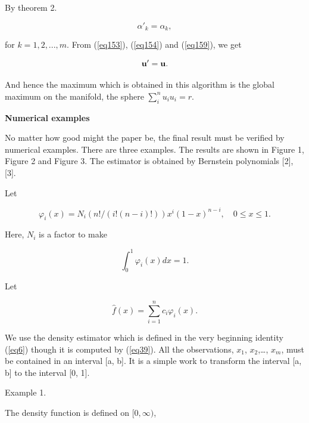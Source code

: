 \documentclass [18pt]{article}
\begin{document}
By theorem 2.


\begin{equation}
\label{eq159}
\alpha '_k = \alpha _k ,
\end{equation}



\noindent
for $k = 1,2,...,m$. From (\ref{eq153}), (\ref{eq154}) and (\ref{eq159}), we get


\begin{equation}
\label{eq160}
{\rm {\bf u}}' = {\rm {\bf u}}.
\end{equation}



And hence the maximum which is obtained in this algorithm is the global
maximum on the manifold, the sphere $\sum\limits_i^n {u_i } u_i = r$.

\textbf{Numerical examples}

No matter how good might the paper be, the final result must be verified by
numerical examples. There are three examples. The results are shown in
Figure 1, Figure 2 and Figure 3. The estimator is obtained by Bernstein
polynomials [2], [3].

Let


\begin{equation}
\label{eq161}
\varphi _i (x) = N_i (n! / (i!(n - i)!))x^i(1 - x)^{n - i},
\quad
0 \le x \le 1.
\end{equation}



Here, $N_i $ is a factor to make


\begin{equation}
\label{eq162}
\int_0^1 {\varphi _i (x)dx = 1} .
\end{equation}



Let


\begin{equation}
\label{eq163}
\widehat{f}(x) = \sum\limits_{i = 1}^n {c_i \varphi _i (x)} .
\end{equation}



We use the density estimator which is defined in the very beginning identity
(\ref{eq6}) though it is computed by (\ref{eq39}). All the observations, $x_1 $, $x_2
$,\ldots , $x_m $, must be contained in an interval [a, b]. It is a simple
work to transform the interval [a, b] to the interval [0, 1].

Example 1.

The density function is defined on $[0,\infty )$,
\end{document}
